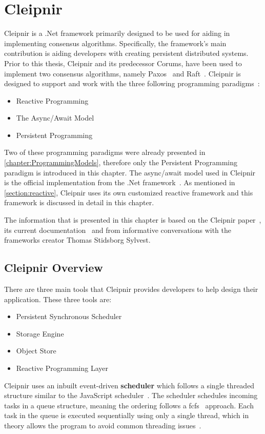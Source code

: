 \chapter{Cleipnir}
\label{chapter:Cleipnir}

Cleipnir is a .Net framework primarily designed to be used for aiding in implementing consensus algorithms. Specifically, the framework's main contribution is aiding developers with creating persistent distributed systems. Prior to this thesis, Cleipnir and its predecessor Corums, have been used to implement two consensus algorithms, namely Paxos~\cite[p.~32-38]{PAPER:EivindPaper} and Raft~\cite[p.~13-15]{PAPER:PaxosCleipnir}.
Cleipnir is designed to support and work with the three following programming paradigms~\cite[p.~5]{PAPER:PaxosCleipnir}:
\begin{itemize}
\item {Reactive Programming}
\item {The Async/Await Model}
\item {Persistent Programming}
\end{itemize}

Two of these programming paradigms were already presented in \autoref{chapter:ProgrammingModels}, therefore only the Persistent Programming paradigm is introduced in this chapter. The async/await model used in Cleipnir is the official implementation from the .Net framework~\cite{DOC:AsyncAwait}. As mentioned in \autoref{section:reactive}, Cleipnir uses its own customized reactive framework and this framework is discussed in detail in this chapter.

The information that is presented in this chapter is based on the Cleipnir paper~\cite{PAPER:PaxosCleipnir}, its current documentation~\cite{DOC:Cleipnir} and from informative conversations with the frameworks creator Thomas Stidsborg Sylvest.

\section{Cleipnir Overview}
\label{section:CleipnirOv}
There are three main tools that Cleipnir provides developers to help design their application.
These three tools are:
\begin{itemize}
	\item{Persistent Synchronous Scheduler}
	\item{Storage Engine}
	\item{Object Store}
	\item{Reactive Programming Layer}
\end{itemize}
Cleipnir uses an inbuilt event-driven \textbf{scheduler} which follows a single threaded structure similar to the JavaScript scheduler~\cites[p.~7]{PAPER:PaxosCleipnir}{WEB:CleipnirScheduler}. The scheduler schedules incoming tasks in a queue structure, meaning the ordering follows a \ac{fcfs}~\cite{WEB:FIFO} approach. Each task in the queue is executed sequentially using only a single thread, which in theory allows the program to avoid common threading issues~\cite[p.~7]{PAPER:PaxosCleipnir}. %

